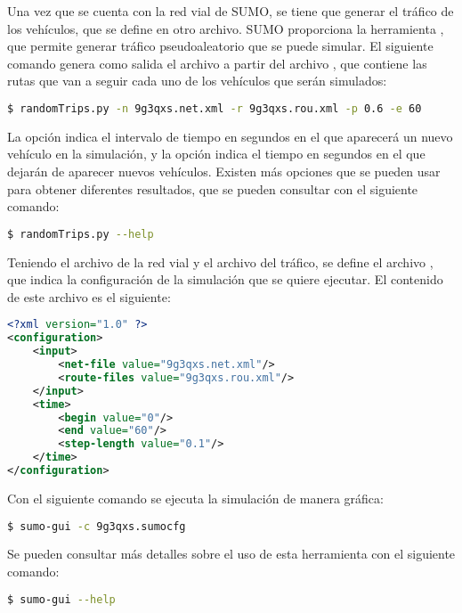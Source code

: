 Una vez que se cuenta con la red vial de SUMO, se tiene que generar el tráfico
de los vehículos, que se define en otro archivo. SUMO proporciona la
herramienta , que permite generar tráfico pseudoaleatorio
que se puede simular. El siguiente comando genera como salida el archivo
 a partir del archivo , que contiene
las rutas que van a seguir cada uno de los vehículos que serán simulados:

\begin{lstlisting}[language=bash]
$ randomTrips.py -n 9g3qxs.net.xml -r 9g3qxs.rou.xml -p 0.6 -e 60
\end{lstlisting}

La opción  indica el intervalo de tiempo en segundos en el que
aparecerá un nuevo vehículo en la simulación, y la opción  indica el
tiempo en segundos en el que dejarán de aparecer nuevos vehículos. Existen más
opciones que se pueden usar para obtener diferentes resultados, que se pueden
consultar con el siguiente comando:

\begin{lstlisting}[language=bash]
$ randomTrips.py --help
\end{lstlisting}

Teniendo el archivo  de la red vial y el archivo
 del tráfico, se define el archivo ,
que indica la configuración de la simulación que se quiere ejecutar. El
contenido de este archivo es el siguiente:

\begin{lstlisting}[language=XML]
<?xml version="1.0" ?>
<configuration>
    <input>
        <net-file value="9g3qxs.net.xml"/>
        <route-files value="9g3qxs.rou.xml"/>
    </input>
    <time>
        <begin value="0"/>
        <end value="60"/>
        <step-length value="0.1"/>
    </time>
</configuration>
\end{lstlisting}

Con el siguiente comando se ejecuta la simulación de manera gráfica:

\begin{lstlisting}[language=bash]
$ sumo-gui -c 9g3qxs.sumocfg
\end{lstlisting}

Se pueden consultar más detalles sobre el uso de esta herramienta con el
siguiente comando:

\begin{lstlisting}[language=bash]
$ sumo-gui --help
\end{lstlisting}

